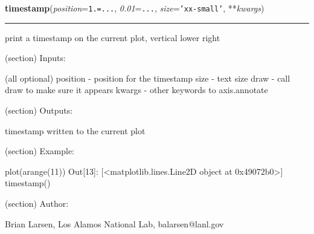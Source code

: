\hspace{.8\funcindent}\begin{boxedminipage}{\funcwidth}

    \raggedright \textbf{timestamp}(\textit{position}={\tt 1.=...}, \textit{0.01}={\tt ...}, \textit{size}={\tt 'xx-small'}, **\textit{kwargs})

    \vspace{-1.5ex}

    \rule{\textwidth}{0.5\fboxrule}
\setlength{\parskip}{2ex}
    print a timestamp on the current plot, vertical lower right

    (section) Inputs:

      (all optional) position - position for the timestamp size - text size
      draw - call draw to make sure it appears kwargs - other keywords to 
      axis.annotate

    (section) Outputs:

      timestamp written to the current plot

    (section) Example:

      plot(arange(11)) Out[13]: [{\textless}matplotlib.lines.Line2D object 
      at 0x49072b0{\textgreater}] timestamp()

    (section) Author:

      Brian Larsen, Los Alamos National Lab, balarsen@lanl.gov

\setlength{\parskip}{1ex}
    \end{boxedminipage}

    \label{spacepy:toolbox:query_yes_no}

    \vspace{0.5ex}

